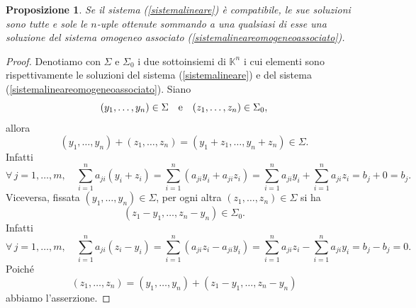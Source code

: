 \documentclass{article}
\theoremstyle{plain}
\newtheorem{prop}[thm]{Proposizione}
\theoremstyle{definition}
\theoremstyle{remark}
\begin{document}
\vspace{10pt}

\begin{bxthm}
\begin{prop}
    Se il sistema (\ref{sistemalineare}) è compatibile, le sue soluzioni sono tutte e sole le \( n \)-uple ottenute sommando a una qualsiasi di esse una soluzione del sistema omogeneo associato (\ref{sistemalineareomogeneoassociato}).
\end{prop}
\end{bxthm}
\begin{proof}
    Denotiamo con \( \Sigma \) e \( \Sigma_0 \) i due sottoinsiemi di \( \mathbb{K}^n \) i cui elementi sono rispettivamente le soluzioni del sistema (\ref{sistemalineare}) e del sistema (\ref{sistemalineareomogeneoassociato}).
    Siano \[ (y_1, \ldots, y_n) \in \Sigma\quad\textup{e}\quad(z_1, \ldots, z_n) \in \Sigma_0, \] allora
    \[(y_1, \ldots, y_n) + (z_1, \ldots, z_n) = (y_1 + z_1, \ldots, y_n + z_n) \in \Sigma.\]
    Infatti
    \[ \forall\,j = 1, \ldots, m,\quad\sum_{i=1}^{n}a_{ji}(y_i + z_i) =\sum_{i=1}^{n}(a_{ji}y_i + a_{ji}z_i) =\sum_{i=1}^{n}a_{ji}y_i + \sum_{i=1}^{n}a_{ji}z_i = b_j + 0 = b_j.\]
    Viceversa, fissata \( (y_1, \ldots, y_n) \in \Sigma \), per ogni altra \( (z_1, \ldots, z_n) \in \Sigma \) si ha \[ (z_1 - y_1, \ldots, z_n - y_n) \in \Sigma_0. \]    
    Infatti 
    \[\forall\,j = 1, \ldots, m,\quad 
    \sum_{i=1}^{n}a_{ji}(z_i - y_i) = \sum_{i=1}^{n}(a_{ji}z_i - a_{ji}y_i) = \sum_{i=1}^{n}a_{ji}z_i - \sum_{i=1}^{n}a_{ji}y_i = b_j - b_j = 0.\]
    Poiché
    \[(z_1, \ldots, z_n) = (y_1, \ldots, y_n) + (z_1 - y_1, \ldots, z_n - y_n)\]
    abbiamo l'asserzione.
\end{proof}

\vspace{10pt}
\end{document}
